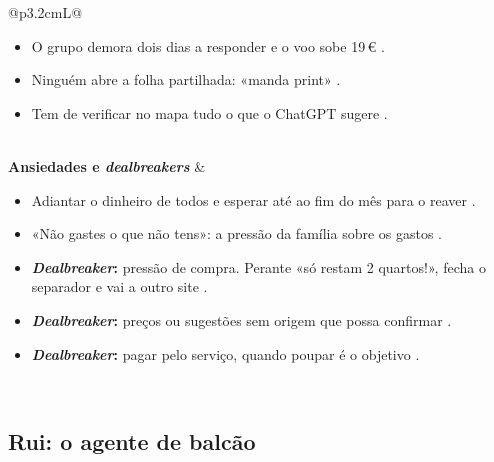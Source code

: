 \begin{table}[H]
\begin{tabularx}{\textwidth}{@{}p{3.2cm}L@{}}
\begin{itemize}[topsep=0pt]
  \item O grupo demora dois dias a responder e o voo sobe 19\,€ .
  \item Ninguém abre a folha partilhada: «manda print» .
  \item Tem de verificar no mapa tudo o que o ChatGPT sugere .
\end{itemize} \\
\midrule
\textbf{Ansiedades e \textit{dealbreakers}} &
\begin{itemize}[topsep=0pt]
  \item Adiantar o dinheiro de todos e esperar até ao fim do mês para o reaver .
  \item «Não gastes o que não tens»: a pressão da família sobre os gastos .
  \item \textbf{\textit{Dealbreaker}:} pressão de compra. Perante «só restam 2 quartos!», fecha o separador e vai a outro site .
  \item \textbf{\textit{Dealbreaker}:} preços ou sugestões sem origem que possa confirmar .
  \item \textbf{\textit{Dealbreaker}:} pagar pelo serviço, quando poupar é o objetivo \suposicao.
\end{itemize} \\
\bottomrule
\end{tabularx}
\caption{Persona Inês: objetivos, motivações, atritos e ansiedades.}
\label{tab:persona-ines}
\end{table}

\subsection{Rui: o agente de balcão}\label{sec:persona-rui}

